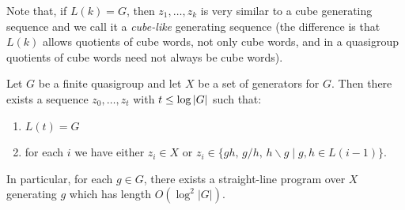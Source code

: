 \documentclass{article}
\newcommand{\abs}[1]{\left|\mathinner{#1}\right|}
\begin{document}
Note that, if $L(k) = G$, then $z_1,\dotsc,z_k$ is very similar to a cube generating sequence and we call it a  \emph{cube-like} generating sequence (the difference is that $L(k)$ allows quotients of cube words, not only cube words, and in a quasigroup quotients of cube words need not always be cube words). 

\begin{lemma}\label{extendedReachability} 
Let $G$ be a finite quasigroup and let $X$ be a set of generators for $G$. Then there exists a sequence $z_0, \dots, z_t$ with $t\leq \log \abs{G}$ such that:
\begin{enumerate}[label*=(\arabic*)]
    \item $L(t) = G$
    \item\label{zinL} for each $i$ we have either $z_i \in X$ or $z_i \in \{ gh,\, g/h,\, h\backslash g\mid g,h \in L(i-1) \}$.
\end{enumerate}
In particular, for each $g \in G$, there exists a straight-line program over $X$ generating $g$ which has length $O(\log^2 |G|)$.
\end{lemma}
\end{document}
